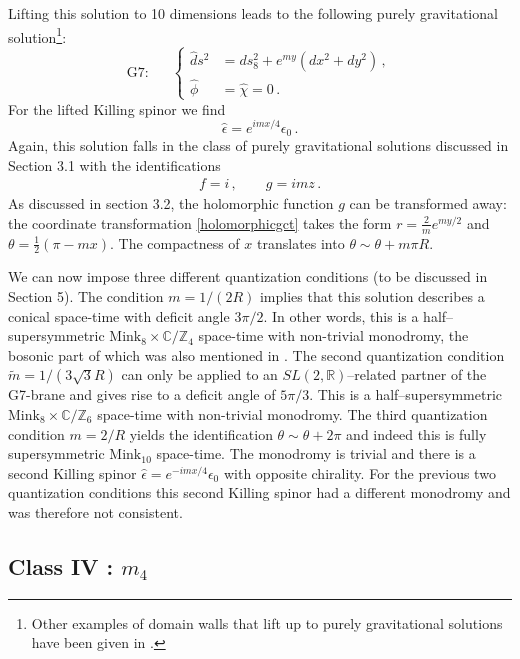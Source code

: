 \documentclass[12pt,a4paper]{article}
\begin{document}
Lifting this solution to 10 dimensions leads to
the following purely gravitational solution\footnote{Other examples
of domain walls that lift up to purely gravitational solutions
have been given in \cite{Gibbons:2001ds}.}:
\begin{equation}
\text{G7:~~~~~}\left\{\begin{aligned}
  \hat{d}s^2 & = ds_8^2 + e^{m y} \left(dx^2+ dy^2 \right)\,,\\
  {\hat\phi} & = \hat\chi = 0\, .
\end{aligned}\right.
\end{equation}
For the lifted Killing spinor we find
\begin{equation}
  \hat\epsilon=e^{i m x /4}\epsilon_0\, .
\end{equation}
Again, this solution falls in the class of purely gravitational
solutions discussed in Section 3.1 with the identifications
\begin{align}
  f =i \,, \qquad g = i m z \,.
\end{align}
As discussed in section 3.2, the holomorphic function $g$ can be
transformed away: the coordinate transformation \eqref{holomorphicgct} takes
the form $r=\frac{2}{m}e^{m y/2}$ and $\theta=\tfrac{1}{2}(\pi- mx)$. The
compactness of $x$ translates into $\theta \sim \theta + m \pi R$. 

We can now impose three different quantization conditions (to be discussed in Section 5).
The condition $m=1/(2 R)$ implies that this solution describes a conical space-time
with deficit angle $3\pi/2$. In other words, this is a half--supersymmetric 
$\text{Mink}_8 \times \mathbb{C} / \mathbb{Z}_4$ space-time with non-trivial monodromy, 
the bosonic part of which was also mentioned in \cite{Greene:1990ya}. The second
quantization condition $\tilde m = 1/(3 \sqrt{3} R)$ can only be applied to an 
$SL(2,\mathbb{R})$--related partner of the G7-brane and gives rise to a deficit
angle of $5\pi/3$. This is a half--supersymmetric 
$\text{Mink}_8 \times \mathbb{C} / \mathbb{Z}_6$ space-time with non-trivial monodromy.
The third quantization condition $m=2/R$ yields the identification 
$\theta \sim \theta + 2 \pi$ and indeed this is fully supersymmetric $\text{Mink}_{10}$ space-time. 
The monodromy is trivial and there is a second Killing spinor $\hat\epsilon=e^{-i m x /4}\epsilon_0$ 
with opposite chirality. For the previous two quantization conditions this second
Killing spinor had a different monodromy and was therefore not consistent.


\subsection{Class IV : $m_4$}
\end{document}
